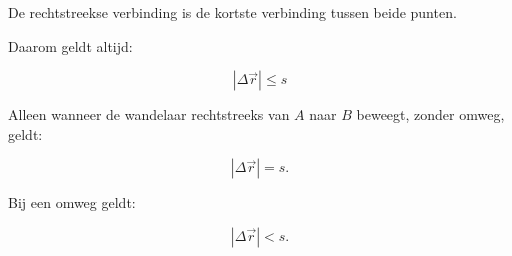 \documentclass{ximera}
\begin{document}
\begin{oefening}{\oefU\ESS}
\begin{question}
\begin{oplossing}
  De rechtstreekse verbinding is de kortste verbinding tussen beide punten.
  
  Daarom geldt altijd:
  
  \[
  \boxed{
  |\Delta\vec{r}| \leq s
  }
  \]
  
  Alleen wanneer de wandelaar rechtstreeks van $A$ naar $B$ beweegt, zonder
  omweg, geldt:
  
  \[
  |\Delta\vec{r}|=s.
  \]
  
  Bij een omweg geldt:
  
  \[
  |\Delta\vec{r}|<s.
  \]
  \end{oplossing}
  \end{question}
  
  \end{oefening}

\end{document}
